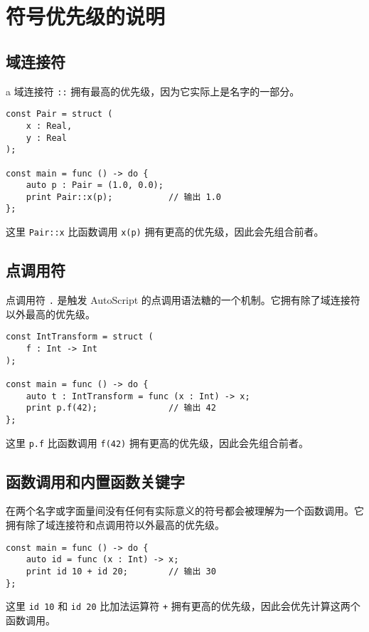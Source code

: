 \section{符号优先级的说明}

\subsection{域连接符}
a
域连接符 \lstinline!::! 拥有最高的优先级，因为它实际上是名字的一部分。

\begin{lstlisting}
const Pair = struct (
    x : Real,
    y : Real
);

const main = func () -> do {
    auto p : Pair = (1.0, 0.0);
    print Pair::x(p);           // 输出 1.0
};
\end{lstlisting}

这里 \lstinline!Pair::x! 比函数调用 \lstinline!x(p)! 拥有更高的优先级，因此会先组合前者。

\subsection{点调用符}

点调用符 \lstinline!.! 是触发 AutoScript 的点调用语法糖的一个机制。它拥有除了域连接符以外最高的优先级。

\begin{lstlisting}
const IntTransform = struct (
    f : Int -> Int
);

const main = func () -> do {
    auto t : IntTransform = func (x : Int) -> x;
    print p.f(42);              // 输出 42
};
\end{lstlisting}

这里 \lstinline!p.f! 比函数调用 \lstinline!f(42)! 拥有更高的优先级，因此会先组合前者。

\subsection{函数调用和内置函数关键字}

在两个名字或字面量间没有任何有实际意义的符号都会被理解为一个函数调用。它拥有除了域连接符和点调用符以外最高的优先级。

\begin{lstlisting}
const main = func () -> do {
    auto id = func (x : Int) -> x;
    print id 10 + id 20;        // 输出 30
};
\end{lstlisting}

这里 \lstinline!id 10! 和 \lstinline!id 20! 比加法运算符 \lstinline!+! 拥有更高的优先级，因此会优先计算这两个函数调用。 \\

